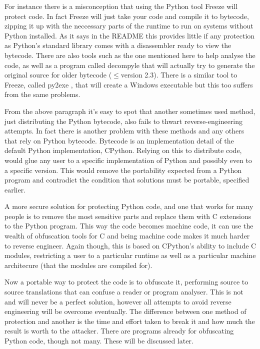 \documentclass{report}
\begin{document}
For instance there is a misconception that using the Python tool Freeze will protect code. In fact Freeze will
just take your code and compile it to bytecode, zipping it up with the neccessary parts of the runtime to run
on systems without Python installed. As it says in the README \cite{freezereadme} this provides little if any
protection as Python's standard library comes with a disassembler ready to view the bytecode. There are also
tools such as the one mentioned here \cite{pirates} to help analyse the code, as well as a program called
decompyle \cite{decompyle} that will actually try to generate the original source for older bytecode ($\le$version
2.3). There is a similar tool to Freeze, called py2exe \cite{py2exe}, that will create a Windows executable but
this too suffers from the same problems.

From the above paragraph it's easy to spot that another sometimes used method, just distributing the Python
bytecode, also fails to thwart reverse-engineering attempts. In fact there is another problem
with these methods and any others that rely on Python bytecode. Bytecode is an implementation detail \cite{dis}
of the default Python implementation, CPython. Relying on this to distribute code, would glue any
user to a specific implementation of Python and possibly even to a specific version. This would remove the portability
expected from a Python program and contradict the condition that solutions must be portable, specified earlier.

A more secure solution for protecting Python code, and one that works for many people is to remove the most
sensitive parts and replace them with C extensions to the Python program. This way the code becomes machine
code, it can use the wealth of obfuscation tools for C and being machine code makes it much
harder to reverse engineer. Again though, this is based on CPython's ability to include C modules, restricting a
user to a particular runtime as well as a particular machine architecure (that the modules are compiled for).

Now a portable way to protect the code is to obfuscate it, performing source to source translations that can
confuse a reader or program analyser. This is not and will never be a perfect solution, however all attempts
to avoid reverse engineering will be overcome eventually. The difference between one method of protection and
another is the time and effort taken to break it and how much the result is worth to the attacker. There are
programs already for obfuscating Python code, though not many. These will be discussed later.
\end{document}
